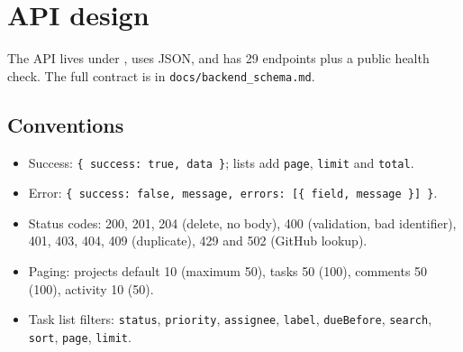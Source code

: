 \documentclass[11pt,a4paper]{article}
\newcommand{\code}[1]{\texttt{#1}}
\begin{document}
\section{API design}
The API lives under , uses JSON, and has 29 endpoints plus a public health check. The full contract is in \code{docs/backend\_schema.md}.

\subsection{Conventions}
\begin{itemize}
  \item Success: \code{\{ success: true, data \}}; lists add \code{page}, \code{limit} and \code{total}.
  \item Error: \code{\{ success: false, message, errors: [\{ field, message \}] \}}.
  \item Status codes: 200, 201, 204 (delete, no body), 400 (validation, bad identifier), 401, 403, 404, 409 (duplicate), 429 and 502 (GitHub lookup).
  \item Paging: projects default 10 (maximum 50), tasks 50 (100), comments 50 (100), activity 10 (50).
  \item Task list filters: \code{status}, \code{priority}, \code{assignee}, \code{label}, \code{dueBefore}, \code{search}, \code{sort}, \code{page}, \code{limit}.
\end{itemize}
\end{document}
